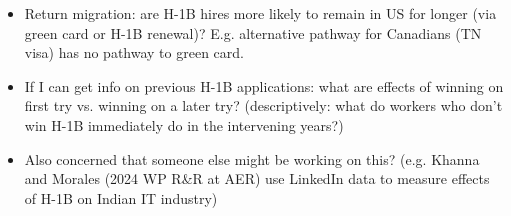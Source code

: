 \documentclass[xcolor=dvipsnames, compress, 12pt, aspectratio=169, handout]{beamer}
\begin{document}
\begin{frame}[allowframebreaks]
\begin{itemize}
\begin{itemize}
            \item Return migration: are H-1B hires more likely to remain in US for longer (via green card or H-1B renewal)? E.g. alternative pathway for Canadians (TN visa) has no pathway to green card.
            \item If I can get info on previous H-1B applications: what are effects of winning on first try vs. winning on a later try? (descriptively: what do workers who don't win H-1B immediately do in the intervening years?)
            \item Also concerned that someone else might be working on this? (e.g. Khanna and Morales (2024 WP R\&R at AER) use LinkedIn data to measure effects of H-1B on Indian IT industry)
        \end{itemize}
    \end{itemize} 
\end{frame}
\end{document}
